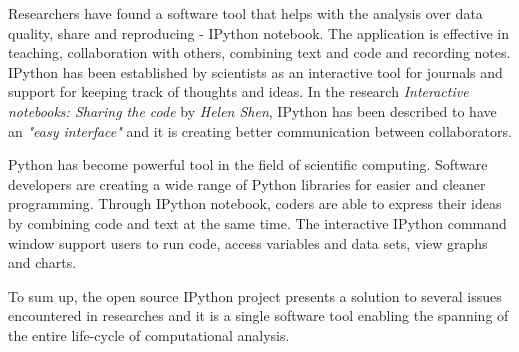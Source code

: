 Researchers have found a software tool that helps with the analysis over data quality, share and reproducing - IPython notebook. The application is effective in teaching, collaboration with others, combining text and code and recording notes. IPython has been established by scientists as an interactive tool for journals and support for keeping track of thoughts and ideas. In the research \textit{Interactive notebooks: Sharing the code} by \textit{Helen Shen}, IPython has been described to have an \textit{"easy interface"} and it is creating better communication between collaborators.\cite{shen2014interactive}

Python has become powerful tool in the field of scientific computing. Software developers are creating a wide range of Python libraries for easier and cleaner programming. Through IPython notebook, coders are able to express their ideas by combining code and text at the same time. The interactive IPython command window support users to run code, access variables and data sets, view graphs and charts.\cite{perez2013open}

To sum up, the open source IPython project presents a solution to several issues encountered in researches and it is a single software tool enabling the spanning of the entire life-cycle of computational analysis. 

